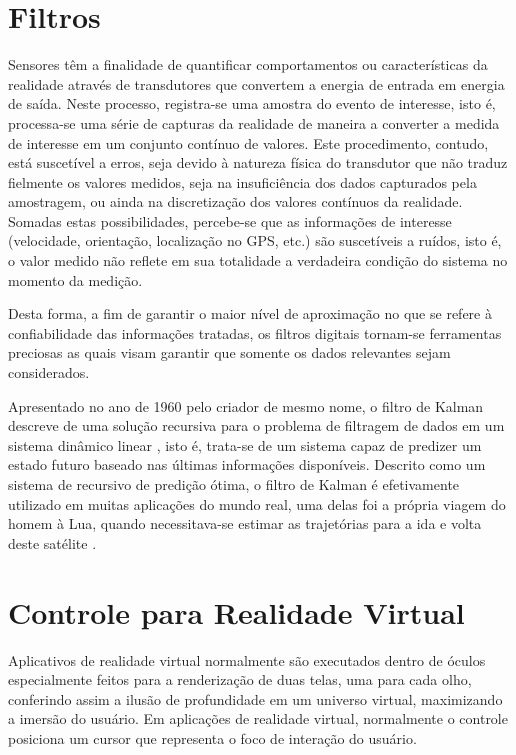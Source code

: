 \documentclass[conference]{IEEEtran}
\begin{document}
\section{Filtros} \label{sec:filters}
Sensores têm a finalidade de quantificar comportamentos ou características da realidade através de transdutores que convertem a energia de entrada em energia de saída. Neste processo, registra-se uma amostra do evento de interesse, isto é, processa-se uma série de capturas da realidade de maneira a converter a medida de interesse em um conjunto contínuo de valores. Este procedimento, contudo, está suscetível a erros, seja devido à natureza física do transdutor que não traduz fielmente os valores medidos, seja na insuficiência dos dados capturados pela amostragem, ou ainda na discretização dos valores contínuos da realidade. Somadas estas possibilidades, percebe-se que as informações de interesse (velocidade, orientação, localização no GPS, etc.) são suscetíveis a ruídos, isto é, o valor medido não reflete em sua totalidade a verdadeira condição do sistema no momento da medição.

Desta forma, a fim de garantir o maior nível de aproximação no que se refere à confiabilidade das informações tratadas, os filtros digitais tornam-se ferramentas preciosas as quais visam garantir que somente os dados relevantes sejam considerados.

Apresentado no ano de 1960 pelo criador de mesmo nome, o filtro de Kalman descreve de uma solução recursiva para o problema de filtragem de dados em um sistema dinâmico linear \cite{WelchBishop}, isto é, trata-se de um sistema capaz de predizer um estado futuro baseado nas últimas informações disponíveis. Descrito como um sistema de recursivo de predição ótima, o filtro de Kalman é efetivamente utilizado em muitas aplicações do mundo real, uma delas foi a própria viagem do homem à Lua, quando necessitava-se estimar as trajetórias para a ida e volta deste satélite \cite{GrewalAndrews}.

\section{Controle para Realidade Virtual} \label{sec:vrcontroller}

Aplicativos de realidade virtual normalmente são executados dentro de óculos especialmente feitos para a renderização de duas telas, uma para cada olho, conferindo assim a ilusão de profundidade em um universo virtual, maximizando a imersão do usuário. Em aplicações de realidade virtual, normalmente o controle posiciona um cursor que representa o foco de interação do usuário.
\end{document}
